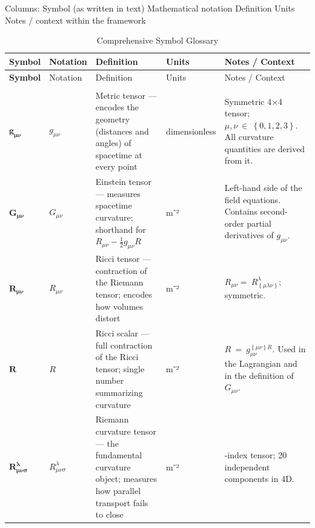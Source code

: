 \documentclass[11pt]{article}
\makeatletter
\newcommand{\TableHeaderRow}{\rowcolor{black!10}\bfseries}
\newcommand{\TableSection}[1]{%
  \hiderowcolors
  \rowcolor{black!15}\multicolumn{5}{@{}l@{}}{\textbf{#1}}\\
  \showrowcolors
}
\makeatother
\begin{document}
Columns: Symbol (as written in text) \textbar{} Mathematical notation \textbar{} Definition \textbar{} Units \textbar{} Notes / context within the framework

\begingroup\small
\setlength{\LTleft}{0pt}
\setlength{\LTright}{0pt}
\begin{longtable}[]{@{}
  >{\raggedright\arraybackslash}p{}
  >{\raggedright\arraybackslash}p{}
  >{\raggedright\arraybackslash}p{}
  >{\raggedright\arraybackslash}p{}
  >{\raggedright\arraybackslash}p{}@{}}
\caption{\protect{}\label{_Toc222952635}{}Comprehensive Symbol Glossary}\tabularnewline
\toprule
\TableHeaderRow Symbol & Notation & Definition & Units & Notes / Context \\
\midrule
\endfirsthead
\toprule
\TableHeaderRow Symbol & Notation & Definition & Units & Notes / Context \\
\midrule
\endhead
\bottomrule
\endlastfoot
\TableSection{I. Spacetime Geometry}
\(\mathbf{g}_{\mathbf{\mu\nu}}\) & \(g_{\mu\nu}\) & Metric tensor --- encodes the geometry (distances and angles) of spacetime at every point & dimensionless & Symmetric 4×4 tensor; \(\mu,\nu\  \in \ \left\{ 0,1,2,3 \right\}\). All curvature quantities are derived from it. \\
\(\mathbf{G}_{\mathbf{\mu\nu}}\) & \(G_{\mu\nu}\) & Einstein tensor --- measures spacetime curvature; shorthand for \(R_{\mu\nu} - \tfrac{1}{2} g_{\mu\nu}R\) & m⁻² & Left-hand side of the field equations. Contains second-order partial derivatives of \(g_{\mu\nu}\). \\
\(\mathbf{R}_{\mathbf{\mu\nu}}\) & \(R_{\mu\nu}\) & Ricci tensor --- contraction of the Riemann tensor; encodes how volumes distort & m⁻² & \(R_{\mu\nu} = \ R_{\left\{ \mu\lambda\nu \right\}}^{\lambda}\); symmetric. \\
\(\mathbf{R}\) & \(R\) & Ricci scalar --- full contraction of the Ricci tensor; single number summarizing curvature & m⁻² & \(R\  = \ g_{\mu\nu}^{\left\{ \mu\nu \right\} R}\). Used in the Lagrangian and in the definition of \(G_{\mu\nu}\). \\
\(\mathbf{R}_{\mathbf{\mu\nu\sigma}}^{\mathbf{\lambda}}\) & \(R_{\mu\nu\sigma}^{\lambda}\) & Riemann curvature tensor --- the fundamental curvature object; measures how parallel transport fails to close & m⁻² & 4-index tensor; 20 independent components in 4D. \\

\end{longtable}
\end{document}
